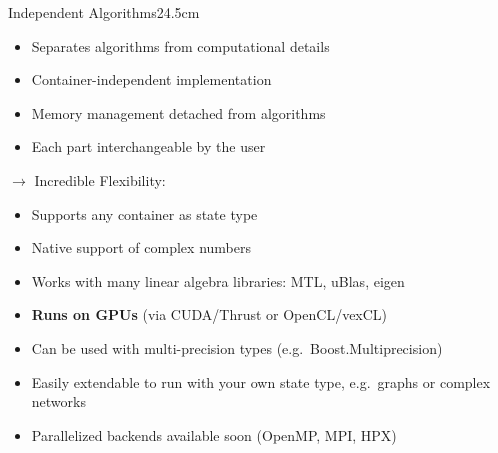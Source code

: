 \documentclass[final,hyperref={pdfpagelabels=false}]{beamer}
\begin{document}
\begin{frame}[fragile]{}
\begin{columns}[t]
  \begin{column}{0.495\linewidth}
    \begin{blockwh}{Independent Algorithms}{24.5cm}
      \begin{itemize}
       \item Separates algorithms from computational details
       \item Container-independent implementation
       \item Memory management detached from algorithms
       \item Each part interchangeable by the user
      \end{itemize}
      \vspace{1em}
      {\large$\longrightarrow$ Incredible Flexibility:}
      \vspace{.5em}
      \begin{itemize}
       \item Supports any container as state type
       \item Native support of complex numbers
       \item Works with many linear algebra libraries: MTL, uBlas, eigen
       \item \textbf{Runs on GPUs} (via CUDA/Thrust or OpenCL/vexCL)
       \item Can be used with multi-precision types (e.g.\ Boost.Multiprecision)
       \item Easily extendable to run with your own state type, e.g.\ graphs or complex networks
       \item Parallelized backends available soon (OpenMP, MPI, HPX)
      \end{itemize}

    \end{blockwh}
  \end{column}

\end{columns}

\begin{columns}[t]


\end{columns}
\end{frame}
\end{document}
